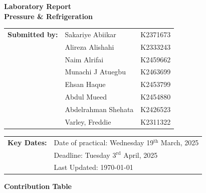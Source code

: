 \documentclass{article}
\begin{document}
	
	\vspace*{\fill}
	\begin{center}
		\textbf{\Huge Laboratory Report}\\[10pt]
		\LARGE \textbf{Pressure \& Refrigeration}
	\end{center}
	\vspace*{\fill}
	
	\Large    
	\begin{tabular}{@{}l l l@{}}
		\textbf{Submitted by:} & Sakariye Abiikar & K2371673 \\
		& Alireza Alishahi & K2333243 \\
		& Naim Alrifai & K2459662 \\
		& Munachi J Atuegbu & K2463699 \\
		& Ehsan Haque & K2453799 \\
		& Abdul Mueed & K2454880 \\   
		& Abdelrahman Shehata & K2426523 \\   
		& Varley, Freddie & K2311322
	\end{tabular}
	
	\vspace*{\fill}
	
	\begin{tabular}{@{}l l@{}}
		\textbf{Key Dates:} & Date of practical: Wednesday 19$^{\text{th}}$ March, 2025 \\
		& Deadline: Tuesday 3$^{\text{rd}}$ April, 2025 \\
		& Last Updated: \today\, \currenttime\\
	\end{tabular}
	\vspace*{\fill}
	
	\large
	\newpage\noindent	\vspace*{-1em}
	
	\begin{center}
		\LARGE \textbf{Contribution Table}\\[3em]
	\end{center}	
	
\end{document}
